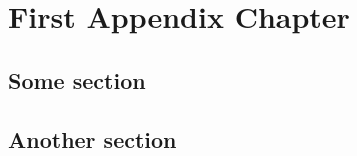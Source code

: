 \appendix


\chapter{First Appendix Chapter}
\label{appendix:magnetic-moment}

\section{Some section}

\lipsum[1]

\section{Another section}

\lipsum[2]
